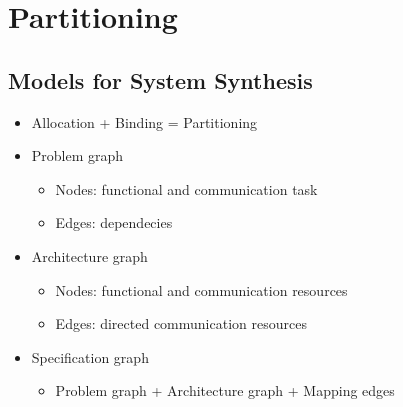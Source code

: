 \section{Partitioning}
\subsection{Models for System Synthesis}
\begin{itemize}
	\item Allocation + Binding = Partitioning
	\item Problem graph
\begin{itemize}
	\item Nodes: functional and communication task
	\item Edges: dependecies
\end{itemize}
	\item Architecture graph
\begin{itemize}
	\item Nodes: functional and communication resources
	\item Edges: directed communication resources 
\end{itemize}
	\item Specification graph
\begin{itemize}
	\item Problem graph + Architecture graph + Mapping edges
\end{itemize}
\end{itemize}


